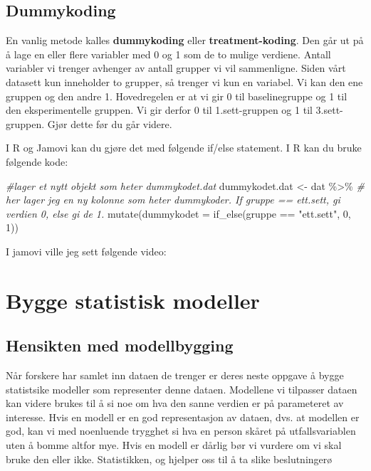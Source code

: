 \documentclass[
]{book}
\newenvironment{Shaded}{\begin{snugshade}}{\end{snugshade}}
\newcommand{\AttributeTok}[1]{\textcolor[rgb]{0.77,0.63,0.00}{#1}}
\newcommand{\CommentTok}[1]{\textcolor[rgb]{0.56,0.35,0.01}{\textit{#1}}}
\newcommand{\DecValTok}[1]{\textcolor[rgb]{0.00,0.00,0.81}{#1}}
\newcommand{\FunctionTok}[1]{\textcolor[rgb]{0.00,0.00,0.00}{#1}}
\newcommand{\NormalTok}[1]{#1}
\newcommand{\OtherTok}[1]{\textcolor[rgb]{0.56,0.35,0.01}{#1}}
\newcommand{\SpecialCharTok}[1]{\textcolor[rgb]{0.00,0.00,0.00}{#1}}
\newcommand{\StringTok}[1]{\textcolor[rgb]{0.31,0.60,0.02}{#1}}
\begin{document}
\hypertarget{dummykoding}{%
\section{Dummykoding}\label{dummykoding}}

En vanlig metode kalles \textbf{dummykoding} eller \textbf{treatment-koding}. Den går ut på å lage en eller flere variabler med 0 og 1 som de to mulige verdiene. Antall variabler vi trenger avhenger av antall grupper vi vil sammenligne. Siden vårt datasett kun inneholder to grupper, så trenger vi kun en variabel. Vi kan den ene gruppen og den andre 1. Hovedregelen er at vi gir 0 til baselinegruppe og 1 til den eksperimentelle gruppen. Vi gir derfor 0 til 1.sett-gruppen og 1 til 3.sett-gruppen. Gjør dette før du går videre.

I R og Jamovi kan du gjøre det med følgende if/else statement. I R kan du bruke følgende kode:

\begin{Shaded}
\begin{Highlighting}[]
\CommentTok{\#lager et nytt objekt som heter dummykodet.dat}
\NormalTok{dummykodet.dat }\OtherTok{\textless{}{-}}\NormalTok{ dat }\SpecialCharTok{\%\textgreater{}\%}
  \CommentTok{\# her lager jeg en ny kolonne som heter dummykoder. If gruppe == \textquotesingle{}ett.sett\textquotesingle{}, gi verdien 0, else gi de 1.}
  \FunctionTok{mutate}\NormalTok{(}\AttributeTok{dummykodet =} \FunctionTok{if\_else}\NormalTok{(gruppe }\SpecialCharTok{==} \StringTok{"ett.sett"}\NormalTok{, }\DecValTok{0}\NormalTok{, }\DecValTok{1}\NormalTok{))}
\end{Highlighting}
\end{Shaded}

I jamovi ville jeg sett følgende video:

\hypertarget{bygge-statistisk-modeller}{%
\chapter{Bygge statistisk modeller}\label{bygge-statistisk-modeller}}

\hypertarget{hensikten-med-modellbygging}{%
\section{Hensikten med modellbygging}\label{hensikten-med-modellbygging}}

Når forskere har samlet inn dataen de trenger er deres neste oppgave å bygge statistsike modeller som representer denne dataen. Modellene vi tilpasser dataen kan videre brukes til å si noe om hva den sanne verdien er på parameteret av interesse. Hvis en modell er en god representasjon av dataen, dvs. at modellen er god, kan vi med noenluende trygghet si hva en person skåret på utfallsvariablen uten å bomme altfor mye. Hvis en modell er dårlig bør vi vurdere om vi skal bruke den eller ikke. Statistikken, og hjelper oss til å ta slike beslutningerø
\end{document}
